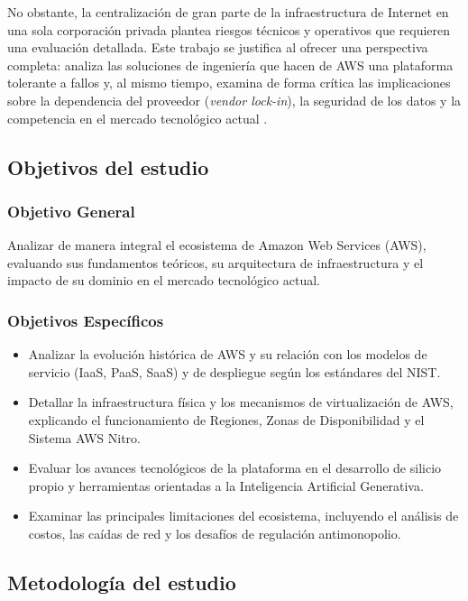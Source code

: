 \documentclass[12pt,a4paper]{article}
\begin{document}
No obstante, la centralización de gran parte de la infraestructura de Internet en una sola corporación privada plantea riesgos técnicos y operativos que requieren una evaluación detallada. Este trabajo se justifica al ofrecer una perspectiva completa: analiza las soluciones de ingeniería que hacen de AWS una plataforma tolerante a fallos y, al mismo tiempo, examina de forma crítica las implicaciones sobre la dependencia del proveedor (\textit{vendor lock-in}), la seguridad de los datos y la competencia en el mercado tecnológico actual \parencite{armbrust2010}.

\subsection{Objetivos del estudio}

\subsubsection{Objetivo General}
Analizar de manera integral el ecosistema de Amazon Web Services (AWS), evaluando sus fundamentos teóricos, su arquitectura de infraestructura y el impacto de su dominio en el mercado tecnológico actual.

\subsubsection{Objetivos Específicos}
\begin{itemize}
    \item Analizar la evolución histórica de AWS y su relación con los modelos de servicio (IaaS, PaaS, SaaS) y de despliegue según los estándares del NIST.
    \item Detallar la infraestructura física y los mecanismos de virtualización de AWS, explicando el funcionamiento de Regiones, Zonas de Disponibilidad y el Sistema AWS Nitro.
    \item Evaluar los avances tecnológicos de la plataforma en el desarrollo de silicio propio y herramientas orientadas a la Inteligencia Artificial Generativa.
    \item Examinar las principales limitaciones del ecosistema, incluyendo el análisis de costos, las caídas de red y los desafíos de regulación antimonopolio.
\end{itemize}

\subsection{Metodología del estudio}
\end{document}
